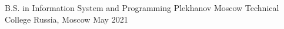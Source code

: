 
\begin{cventries}

  \cventry
    {B.S. in Information System and Programming} %
    {Plekhanov Moscow Technical College } %
    {Russia, Moscow} %
    {May 2021} %
    {
    }
\end{cventries}
